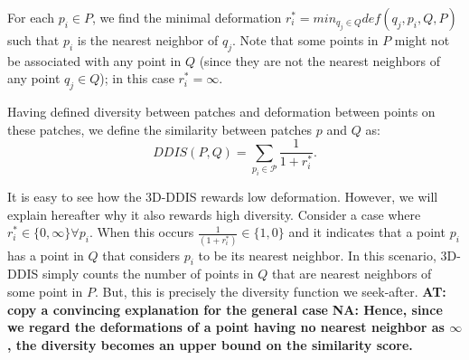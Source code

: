 \documentclass[10pt,twocolumn,letterpaper]{article}
\newcommand{\colornote}[3]{{\color{#1}\bf{#2: #3}\normalfont}}
\newcommand{\colornote}[3]{}
\newcommand {\ayellet}[1]{\colornote{blue}{AT}{#1}}
\newcommand {\nadav}[1]{\colornote{red}{NA}{#1}}
\begin{document}
For each $p_i \in P$, we find the minimal deformation $r_i^*=min_{q_j \in Q}def(q_j,p_i,Q,P)$ such that $p_i$ is the nearest neighbor of $q_j$.
Note that some points in $P$ might not be associated with any point in $Q$ (since they are not the nearest neighbors of any point $q_j\in Q$);
in this case $r_i^*=\infty$.

Having defined diversity between patches and deformation between points on these patches, we define the similarity between patches $p$ and $Q$ as:
\begin{equation}
DDIS(P,Q)=\sum_{p_i\in \mathcal{P}}\frac{1}{1+r_i^*}.
\label{eq:DDIS}
\end{equation}

It is easy to see how the 3D-DDIS rewards low deformation.
However, we will explain hereafter why it also rewards high diversity.
Consider a case where $r_i^*\in\{0,\infty\} \forall p_i$. 
When this occurs $\frac{1}{(1+r_i^*)}\in\{1,0\}$ and it indicates that a point $p_i$ has a point in $Q$ that considers $p_i$ to be its nearest neighbor.
In this scenario, 3D-DDIS simply counts the number of points in $Q$ that are nearest neighbors of some point in $P$.
But, this is precisely the diversity function we seek-after.
\ayellet{copy a convincing explanation for the general case}
\nadav{
Hence, since we regard the deformations of a point having no nearest neighbor as $\infty$, the diversity becomes an upper bound on the similarity score. 
}


\end{document}
